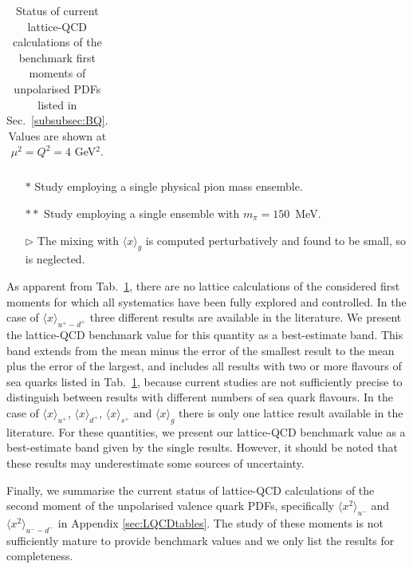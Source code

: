 {\begin{table}[!t]
\begin{tabular}{llcllccccccl}
\bottomrule
\end{tabular}
\begin{minipage}{\linewidth}
{\footnotesize 
\begin{itemize}
\vspace{0.1cm}
\item[$*$] Study employing a single physical pion mass ensemble.
\item[$**$] Study employing a single ensemble with $m_\pi=150$~MeV.
\item[$\triangleright$] The mixing with $\langle x\rangle_{g}$ is computed
perturbatively and found to be small, so is neglected. 
\end{itemize}
}
\end{minipage}
\caption{\small Status of current lattice-QCD calculations of the benchmark 
first moments of unpolarised PDFs listed in Sec.~\ref{subsubsec:BQ}.
%
Values are shown at $\mu^2=Q^2=4$ GeV$^2$.}
\label{tab:unpolLQCDstatus1}
\end{table}

As apparent from Tab.~\ref{tab:unpolLQCDstatus1}, there are no lattice 
calculations of the considered first moments for which all systematics 
have been fully explored and controlled. 
%
In the case of $\langle x\rangle_{u^+-d^+}$ three different results are available 
in the literature.
%
We present the lattice-QCD benchmark value for this quantity 
as a best-estimate band.
% 
This band extends from the mean minus the error of the smallest result to the 
mean plus the error of the largest, and includes all results with two or more 
flavours of sea quarks listed in Tab.~\ref{tab:unpolLQCDstatus1}, because 
current studies are not sufficiently precise to distinguish between results 
with different numbers of sea quark flavours.
%
In the case of $\langle x \rangle_{u^+}$, $\langle x \rangle_{d^+}$, 
$\langle x \rangle_{s^+}$ and $\langle x \rangle_g$ there is only one
lattice result available in the literature. 
%
For these quantities, we present our lattice-QCD benchmark value as
a best-estimate band given by the single results.
% 
However, it should be noted that these results may underestimate some sources 
of uncertainty. 

Finally, we summarise the current status of lattice-QCD calculations of the 
second moment of the unpolarised valence quark PDFs, specifically 
$\langle x^2 \rangle_{u^-}$ and $\langle x^2\rangle_{u^--d^-}$
in Appendix \ref{sec:LQCDtables}.
% 
The study of these moments is not sufficiently mature to provide benchmark 
values and we only list the results for completeness.
}

